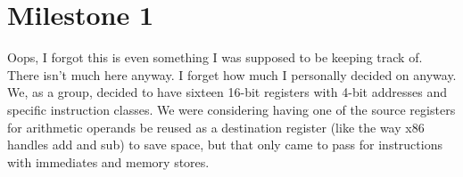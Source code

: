 \documentclass{report}
\begin{document}
\chapter{Milestone 1}
Oops, I forgot this is even something I was supposed to be keeping track of.
There isn't much here anyway. I forget how much I personally decided on anyway.
We, as a group, decided to have sixteen 16-bit registers with 4-bit addresses
and specific instruction classes. We were considering having one of the source
registers for arithmetic operands be reused as a destination register (like the
way x86 handles add and sub) to save space, but that only came to pass for
instructions with immediates and memory stores.
\end{document}
